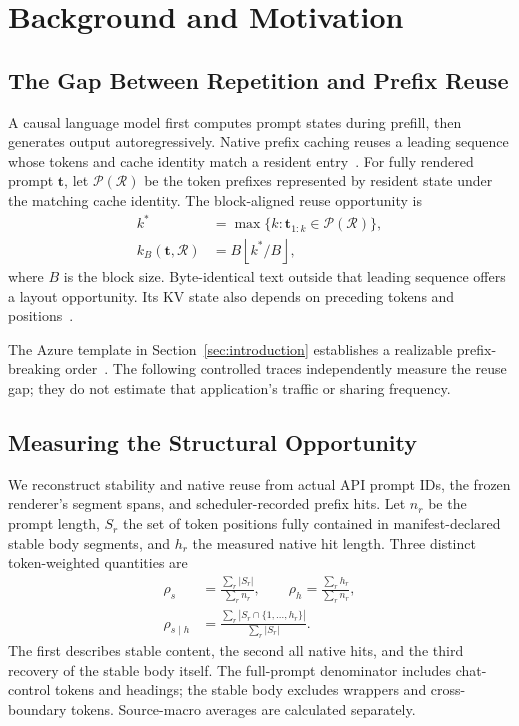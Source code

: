\section{Background and Motivation}
\label{sec:background}

\subsection{The Gap Between Repetition and Prefix Reuse}
A causal language model first computes prompt states during prefill, then generates output autoregressively. Native prefix caching reuses a leading sequence whose tokens and cache identity match a resident entry~\cite{vllm2023,sglang2024}. For fully rendered prompt $\mathbf{t}$, let $\mathcal P(\mathcal R)$ be the token prefixes represented by resident state under the matching cache identity. The block-aligned reuse opportunity is
\begin{equation}
\begin{aligned}
 k^*&=\max\{k:\mathbf{t}_{1:k}\in\mathcal P(\mathcal R)\},\\
 k_B(\mathbf{t},\mathcal R)&=B\left\lfloor k^*/B\right\rfloor,
\end{aligned}
\label{eq:native}
\end{equation}
where $B$ is the block size. Byte-identical text outside that leading sequence offers a layout opportunity. Its KV state also depends on preceding tokens and positions~\cite{vllm2023}.

The Azure template in Section~\ref{sec:introduction} establishes a realizable prefix-breaking order~\cite{azuretemplate}. The following controlled traces independently measure the reuse gap; they do not estimate that application's traffic or sharing frequency.

\subsection{Measuring the Structural Opportunity}
We reconstruct stability and native reuse from actual API prompt IDs, the frozen renderer's segment spans, and scheduler-recorded prefix hits. Let $n_r$ be the prompt length, $S_r$ the set of token positions fully contained in manifest-declared stable body segments, and $h_r$ the measured native hit length. Three distinct token-weighted quantities are
\begin{equation}
\begin{aligned}
 \rho_s&=\frac{\sum_r |S_r|}{\sum_r n_r},\qquad
 \rho_h=\frac{\sum_r h_r}{\sum_r n_r},\\
 \rho_{s\mid h}&=\frac{\sum_r|S_r\cap\{1,\ldots,h_r\}|}{\sum_r|S_r|}.
\end{aligned}
\label{eq:ratios}
\end{equation}
The first describes stable content, the second all native hits, and the third recovery of the stable body itself. The full-prompt denominator includes chat-control tokens and headings; the stable body excludes wrappers and cross-boundary tokens. Source-macro averages are calculated separately.

